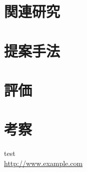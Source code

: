 \documentclass[a4paper,10pt]{article}
\begin{document}
\section{関連研究}

\section{提案手法}

\section{評価}

\section{考察}

\begin{thebibliography}{9}
test\\
\url{http://www.example.com}
\end{thebibliography}
\end{document}
